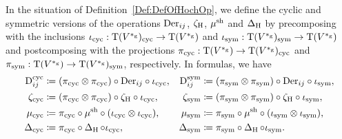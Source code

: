 \documentclass[\MainFolder/Text.tex]{subfiles}
\begin{document}
\begin{Definition}\label{Def:CycSymVersions}
In the situation of Definition~\ref{Def:DefOfHochOp}, we define the cyclic and symmetric versions of the operations $\Der_{ij}$, $\CoProdHoch$, $\ProdSh$ and $\BVOpHoch$ by precomposing with the inclusions $\CycInc: \Ten(V^{\GD})_{\CycMRM} \rightarrow \Ten(V^{\GD})$ and $\SymInc: \Ten(V^{\GD})_{\SymMRM} \rightarrow \Ten(V^{\GD})$ and postcomposing with the projections $\CycProj: \Ten(V^{\GD}) \rightarrow \Ten(V^{\GD})_{\CycMRM}$ and $\SymProj: \Ten(V^{\GD}) \rightarrow \Ten(V^{\GD})_{\SymMRM}$, respectively. In formulas, we have
\begin{equation}\label{Eq:CycSymVersions}\begin{aligned}
 \DerCyc_{ij} & \coloneqq (\CycProj\otimes\CycProj)\circ\Der_{ij}\circ\CycInc, & \DerSym_{ij} & \coloneqq (\SymProj\otimes\SymProj)\circ\Der_{ij}\circ\SymInc, \\
 \CoProdCyc & \coloneqq (\CycProj\otimes\CycProj)\circ\CoProdHoch\circ\CycInc, &  \CoProdSym & \coloneqq (\SymProj\otimes\SymProj)\circ\CoProdHoch\circ\SymInc, \\ 
 \ProdCyc & \coloneqq \CycProj\circ\ProdSh\circ(\CycInc\otimes\CycInc), & \ProdSym & \coloneqq \SymProj\circ\ProdSh\circ(\SymInc\otimes\SymInc), \\ 
 \BVOpCyc & \coloneqq \CycProj\circ\BVOpHoch\circ\CycInc, & \BVOpSym & \coloneqq \SymProj\circ\BVOpHoch\circ\SymInc.
\end{aligned}\end{equation}
\end{Definition}
\end{document}
